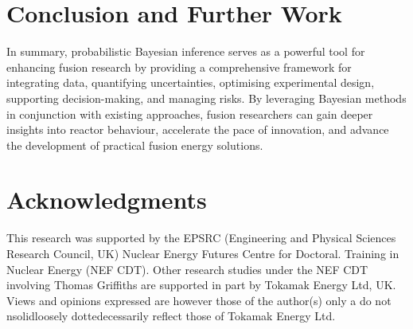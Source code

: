 \documentclass[journal]{IEEEtran}
\begin{document}
\section{Conclusion and Further Work}\label{sec:conc}

In summary, probabilistic Bayesian inference serves as a powerful tool for enhancing fusion research by providing a comprehensive framework for integrating data, quantifying uncertainties, optimising experimental design, supporting decision-making, and managing risks. By leveraging Bayesian methods in conjunction with existing approaches, fusion researchers can gain deeper insights into reactor behaviour, accelerate the pace of innovation, and advance the development of practical fusion energy solutions.

\section{Acknowledgments}
This research was supported by the EPSRC (Engineering and Physical Sciences Research Council, UK) Nuclear Energy Futures Centre for Doctoral. Training in Nuclear Energy (NEF CDT). Other research studies under the NEF CDT involving Thomas Griffiths are supported in part by Tokamak Energy Ltd, UK. Views and opinions expressed are however those of the author(s) only a do not nsolidloosely dottedecessarily reflect those of Tokamak Energy Ltd.





\begin{appendices}
    
 \end{appendices}
\end{document}
